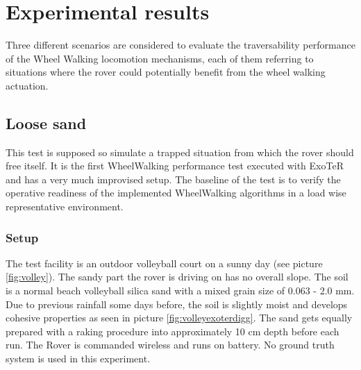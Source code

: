 \documentclass[a4paper,twocolumn]{esapub2005} %
\begin{document}

\section{Experimental results}

Three different scenarios are considered to evaluate the traversability performance of the Wheel Walking locomotion mechanisms, each of them referring to situations where the rover could potentially benefit from the wheel walking actuation.

\subsection{Loose sand}
This test is supposed so simulate a trapped situation from which the rover should free itself. It is the first WheelWalking performance test executed with ExoTeR and has a very much improvised setup. The baseline of the test is to verify the operative readiness of the implemented WheelWalking algorithms in a load wise representative environment.

\subsubsection{Setup}
The test facility is an outdoor volleyball court on a sunny day (see picture \ref{fig:volley}). The sandy part the rover is driving on has no overall slope. The soil is a normal beach volleyball silica sand with a mixed grain size of 0.063 - 2.0 mm. Due to previous rainfall some days before, the soil is slightly moist and develops cohesive properties as seen in picture \ref{fig:volleyexoterdigg}. The sand gets equally prepared with a raking procedure into approximately 10 cm depth before each run.
The Rover is commanded wireless and runs on battery. No ground truth system is used in this experiment. 
\end{document}
